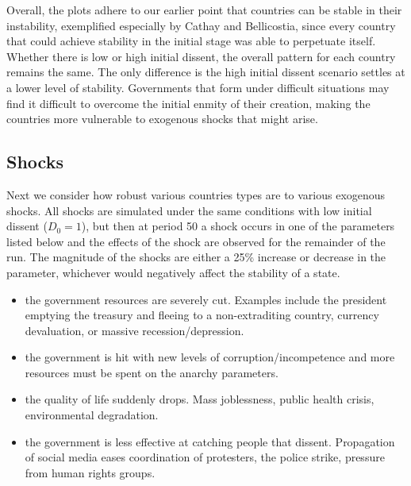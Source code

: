 \documentclass[12pt]{article}
\begin{document}
\begin{spacing}{1.5}
Overall, the plots adhere to our earlier point that countries can be stable in their instability, exemplified especially by Cathay and Bellicostia, since every country that could achieve stability in the initial stage was able to perpetuate itself. Whether there is low or high initial dissent, the overall pattern for each country remains the same. The only difference is the high initial dissent scenario settles at a lower level of stability. Governments that form under difficult situations may find it difficult to overcome the initial enmity of their creation, making the countries more vulnerable to exogenous shocks that might arise.

\subsection{Shocks}

Next we consider how robust various countries types are to various exogenous shocks. All shocks are simulated under the same conditions with low initial dissent ($D_0 = 1$), but then at period 50 a shock occurs in one of the parameters listed below and the effects of the shock are observed for the remainder of the run. The magnitude of the shocks are either a 25\% increase or decrease in the parameter, whichever would negatively affect the stability of a state.  

\begin{itemize}
	\item {} the government resources are severely cut. Examples include the president emptying the treasury and fleeing to a non-extraditing country, currency devaluation, or massive recession/depression.   
	\item \boldmath{$\Omega,\Phi$:} the government is hit with new levels of corruption/incompetence and more resources must be spent on the anarchy parameters. 
	\item {} the quality of life suddenly drops. Mass joblessness, public health crisis, environmental degradation. 
	\item \boldmath{$\sigma$:} the government is less effective at catching people that dissent. Propagation of social media eases coordination of protesters, the police strike, pressure from human rights groups.     
\end{itemize}


\end{spacing}
\end{document}
